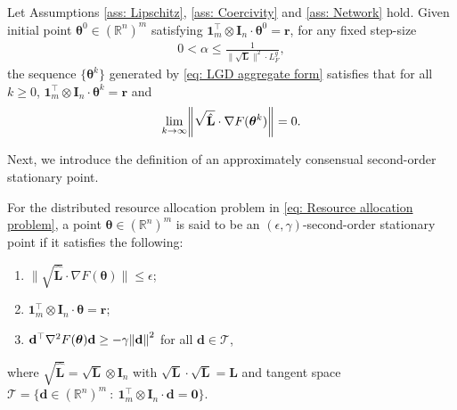 \documentclass{siamart251216}
\begin{document}
\begin{proposition}
\label{pro: First order property}
    Let Assumptions \ref{ass: Lipschitz}, \ref{ass: Coercivity} and \ref{ass: Network} hold. Given initial point $\boldsymbol{\theta}^{0} \in (\mathbb{R}^{n})^{m}$ satisfying $\bm{1}_{m}^{\top} \otimes \mathbf{I}_{n} \cdot \boldsymbol{\theta}^{0} = \bm{r}$, for any fixed step-size
    \begin{gather*}
        0 < \alpha \le \frac{1}{\|\sqrt{\mathbf{L}}\|^{2} \cdot L_{F}^{g}},
    \end{gather*}
    the sequence $\{\boldsymbol{\theta}^{k}\}$ generated by \eqref{eq: LGD aggregate form} satisfies that for all $k \ge 0$, $\bm{1}_{m}^{\top} \otimes \mathbf{I}_{n} \cdot \boldsymbol{\theta}^{k}= \bm{r}$ and
    \begin{gather*}
        \lim_{k\rightarrow\infty} \norm{\sqrt{\hat{\mathbf{L}}} \cdot \nabla F(\boldsymbol{\theta}^{k})} = 0.
    \end{gather*}
\end{proposition}

Next, we introduce the definition of an approximately consensual second-order stationary point.
\begin{definition}
\label{def: Approximately second order stationary point}
    For the distributed resource allocation problem in \eqref{eq: Resource allocation problem}, a point $\boldsymbol{\theta} \in (\mathbb{R}^{n})^{m}$ is said to be an $(\epsilon,\gamma)$-second-order stationary point if it satisfies the following:
    \begin{enumerate}
    \renewcommand{\labelenumi}{\roman{enumi})}
        \item $\|\sqrt{\hat{\mathbf{L}}} \cdot \nabla F(\boldsymbol{\theta})\| \le \epsilon$;
        \item $\bm{1}_{m}^{\top} \otimes \mathbf{I}_{n} \cdot \boldsymbol{\theta} = \bm{r}$;
        \item $\mathbf{d}^{\top} \nabla^{2} F(\boldsymbol{\theta}) \mathbf{d} \ge -\gamma \norm{\mathbf{d}}^{2}$ for all $\mathbf{d} \in \mathcal{T}$,
    \end{enumerate} 
    where $\sqrt{\hat{\mathbf{L}}} = \sqrt{\mathbf{L}}\otimes \mathbf{I}_{n}$ with $\sqrt{\mathbf{L}} \cdot \sqrt{\mathbf{L}} = \mathbf{L}$ and tangent space $\mathcal{T} = \{\mathbf{d} \in (\mathbb{R}^{n})^{m}~:~\bm{1}_{m}^{\top} \otimes \mathbf{I}_{n} \cdot \mathbf{d} = \bm{0}\}$.
\end{definition}
\end{document}
